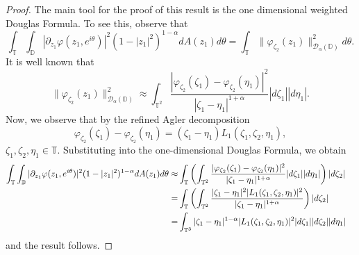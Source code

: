 \documentclass[10pt,a4paper]{amsart}
\begin{document}
\begin{proof} The main tool for the proof of this result is the one dimensional weighted Douglas Formula. To see this, observe that 
$$\int_{\mathbb{T}}\int_{\mathbb{D}}|\partial_{z_1}\varphi(z_1,e^{i\theta})|^2(1-|z_1|^2)^{1-\alpha}dA(z_1)d\theta=\int_{\mathbb{T}}\|\varphi_{\zeta_2}(z_1)\|^2_{\mathcal{D}_{\alpha}(\mathbb{D})}d\theta.$$
It is well known that
$$\|\varphi_{\zeta_2}(z_1)\|^2_{\mathcal{D}_{\alpha}(\mathbb{D})}\approx\int_{\mathbb{T}^2}\frac{|\varphi_{\zeta_2}(\zeta_1)-\varphi_{\zeta_2}(\eta_1)|^2}{|\zeta_1-\eta_1|^{1+\alpha}}|d\zeta_1||d\eta_1|.$$
Now, we observe that by the refined Agler decomposition
$$\varphi_{\zeta_2}(\zeta_1)-\varphi_{\zeta_2}(\eta_1)=(\zeta_1-\eta_1)L_1(\zeta_1,\zeta_2,\eta_1),$$
$\zeta_1,\zeta_2,\eta_1 \in\mathbb{T}.$ Substituting into the one-dimensional Douglas Formula, we obtain
\begin{align}
\int_{\mathbb{T}}\int_{\mathbb{D}}|\partial_{z_1}\varphi(z_1,e^{i\theta})|^2(1-|z_1|^2)^{1-\alpha}dA(z_1)d\theta\approx &\int_{\mathbb{T}}\left(\int_{\mathbb{T}^2}\frac{|\varphi_{\zeta_2}(\zeta_1)-\varphi_{\zeta_2}(\eta_1)|^2}{|\zeta_1-\eta_1|^{1+\alpha}}|d\zeta_1||d\eta_1|\right)|d\zeta_2|&&\\
=&\int_{\mathbb{T}}\left(\int_{\mathbb{T}^2}\frac{|\zeta_1-\eta_1|^2|L_1(\zeta_1,\zeta_2,\eta_1)|^2}{|\zeta_1-\eta_1|^{1+\alpha}}\right)|d\zeta_2| \notag&&\\
=&\int_{\mathbb{T}^3}|\zeta_1-\eta_1|^{1-\alpha}|L_1(\zeta_1,\zeta_2,\eta_1)|^2|d\zeta_1||d\zeta_2||d\eta_1|\notag 
\end{align}
and the result follows.
\end{proof}
\end{document}
